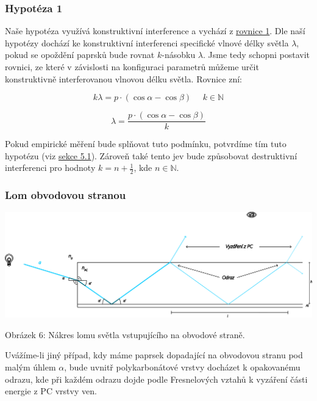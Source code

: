 \documentclass[titlepage]{article}
\begin{document}
\subsubsection{Hypotéza 1}
 \label{hyp:1}
Naše hypotéza využívá konstruktivní interference a vychází z \hyperref[eq1]{rovnice 1}.
Dle naší hypotézy dochází ke konstruktivní interferenci specifické vlnové délky světla $\lambda$, pokud se opoždění paprsků bude rovnat $k$-násobku $\lambda$.
Jsme tedy schopni postavit rovnici, ze které v závislosti na konfiguraci parametrů můžeme určit konstruktivně interferovanou vlnovou délku světla.
Rovnice zní:

\begin{equation}
    \label{eq2}
    k\lambda = p \cdot (\cos{\alpha} - \cos{\beta}) \ \ \ \ \ \  k \in \mathbb{N}
\end{equation}

\begin{equation}
    \label{eq3}
    \lambda = \frac{ p \cdot (\cos{\alpha} - \cos{\beta}) }{k}
\end{equation}

Pokud empirické měření bude splňovat tuto podmínku, potvrdíme tím tuto hypotézu (viz \hyperref[exp:1]{sekce 5.1}).
Zároveň také tento jev bude způsobovat destruktivní interferenci pro hodnoty $k = n + \frac{1}{2}$, kde $n \in \mathbb{N}$.

\subsubsection{Lom obvodovou stranou}

 \label{image:6}
\includegraphics[width=\textwidth]{repeatedrefelction.png}
\begin{center}
    Obrázek 6: Nákres lomu světla vstupujícího na obvodové straně.
\end{center}

Uvážíme-li jiný případ, kdy máme paprsek dopadající na obvodovou stranu pod malým úhlem $\alpha$, bude uvnitř polykarbonátové vrstvy docházet k opakovanému odrazu, kde při každém odrazu dojde podle Fresnelových vztahů k vyzáření části energie z PC vrstvy ven.
\end{document}
